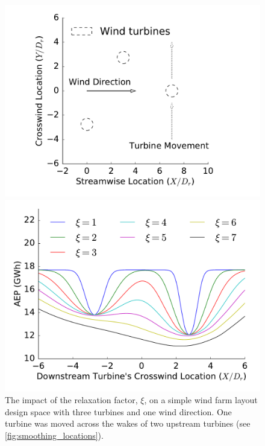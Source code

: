 \documentclass[a4paper]{jpconf}
\begin{document}
\begin{figure}[ht]
\centering
\begin{minipage}[t]{0.43\textwidth}
\centering
\includegraphics[width=\textwidth, trim={2cm 0cm 2cm 0cm}, clip]{smoothing_locations}
\caption{Simple design space used to demonstrate the effects of the relaxation factor, $\xi$, on the wind farm layout design space (see \cref{fig:smoothing_visualization}).}
\label{fig:smoothing_locations}
\end{minipage}\hspace{1pc}%
\begin{minipage}[t]{0.52\textwidth}
\centering
\includegraphics[width=\textwidth]{smoothing_visualization}
\caption{The impact of the relaxation factor, $\xi$, on a simple wind farm layout design space with three turbines and one wind direction. One turbine was moved across the wakes of two upstream turbines (see \cref{fig:smoothing_locations}). }
\label{fig:smoothing_visualization}
\end{minipage} 
\end{figure}
%
\end{document}
